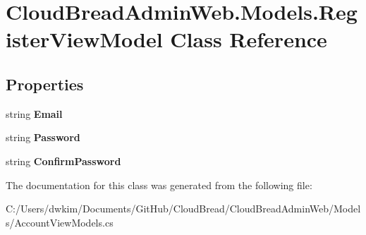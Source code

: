 \hypertarget{class_cloud_bread_admin_web_1_1_models_1_1_register_view_model}{}\section{Cloud\+Bread\+Admin\+Web.\+Models.\+Register\+View\+Model Class Reference}
\label{class_cloud_bread_admin_web_1_1_models_1_1_register_view_model}
\subsection*{Properties}
\begin{DoxyCompactItemize}
\item 
string {\bfseries Email}\hypertarget{class_cloud_bread_admin_web_1_1_models_1_1_register_view_model_afa584697bb9ca879fcd0ae4008a1605d}{}\label{class_cloud_bread_admin_web_1_1_models_1_1_register_view_model_afa584697bb9ca879fcd0ae4008a1605d}

\item 
string {\bfseries Password}\hypertarget{class_cloud_bread_admin_web_1_1_models_1_1_register_view_model_a4b430dcdad4c3d453dbe6a34eeb292a3}{}\label{class_cloud_bread_admin_web_1_1_models_1_1_register_view_model_a4b430dcdad4c3d453dbe6a34eeb292a3}

\item 
string {\bfseries Confirm\+Password}\hypertarget{class_cloud_bread_admin_web_1_1_models_1_1_register_view_model_ab6f369eb2760e39c642a7ecaa29781c2}{}\label{class_cloud_bread_admin_web_1_1_models_1_1_register_view_model_ab6f369eb2760e39c642a7ecaa29781c2}

\end{DoxyCompactItemize}


The documentation for this class was generated from the following file\+:\begin{DoxyCompactItemize}
\item 
C\+:/\+Users/dwkim/\+Documents/\+Git\+Hub/\+Cloud\+Bread/\+Cloud\+Bread\+Admin\+Web/\+Models/Account\+View\+Models.\+cs\end{DoxyCompactItemize}
